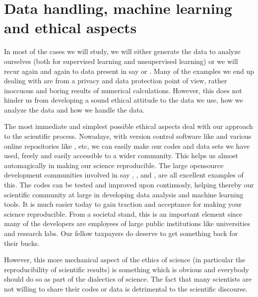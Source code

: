 \documentclass[letterpaper,10pt,english]{sphinxmanual}
\begin{document}
\chapter{Data handling, machine learning  and ethical aspects}
\label{\detokenize{chapter1:data-handling-machine-learning-and-ethical-aspects}}
In most of the cases we will study, we will either generate the data
to analyze ourselves (both for supervised learning and unsupervised
learning) or we will recur again and again to data present in say
 or .  Many of the examples we end up
dealing with are from a privacy and data protection point of view,
rather inoccuous and boring results of numerical
calculations. However, this does not hinder us from developing a sound
ethical attitude to the data we use, how we analyze the data and how
we handle the data.

The most immediate and simplest possible ethical aspects deal with our
approach to the scientific process. Nowadays, with version control
software like  and various online
repositories like ,
 etc, we can easily make our codes
and data sets we have used, freely and easily accessible to a wider
community. This helps us almost automagically in making our science
reproducible. The large open\sphinxhyphen{}source development communities involved
in say ,
,
 and , are
all excellent examples of this. The codes can be tested and improved
upon continuosly, helping thereby our scientific community at large in
developing data analysis and machine learning tools.  It is much
easier today to gain traction and acceptance for making your science
reproducible. From a societal stand, this is an important element
since many of the developers are employees of large public institutions like
universities and research labs. Our fellow taxpayers do deserve to get
something back for their bucks.

However, this more mechanical aspect of the ethics of science (in
particular the reproducibility of scientific results) is something
which is obvious and everybody should do so as part of the dialectics of
science.  The fact that many scientists are not willing to share their codes or
data is detrimental to the scientific discourse.
\end{document}

